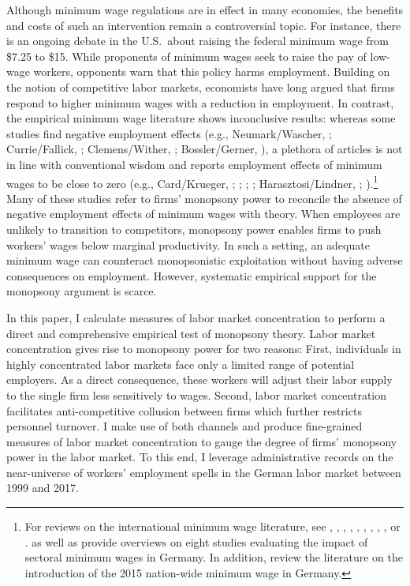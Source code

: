 \documentclass[11pt,oneside,reqno,xcolor=dvipsnames]{article} %
\begin{document}
Although minimum wage regulations are in effect in many economies, the benefits and costs of such an intervention remain a controversial topic. For instance, there is an ongoing debate in the U.S.\ about raising the federal minimum wage from \$7.25 to \$15. While proponents of minimum wages seek to raise the pay of low-wage workers, opponents warn that this policy harms employment. Building on the notion of competitive labor markets, economists have long argued that firms respond to higher minimum wages with a reduction in employment. In contrast, the empirical minimum wage literature shows inconclusive results: whereas some studies find negative employment effects (e.g., Neumark/Wascher, \citeyear{NeumarkWascher1992}; Currie/Fallick, \citeyear{CurrieFallick1996}; Clemens/Wither, \citeyear{ClemensWither2019}; Bossler/Gerner, \citeyear{BosslerGerner2020}), a plethora of articles is not in line with conventional wisdom and reports employment effects of minimum wages to be close to zero (e.g., Card/Krueger, \citeyear{CardKrueger1994}; \citealp{DubeEtAl2010}; \citealp{AllegrettoEtAl2011}; \citealp{CengizEtAl2019}; Harasztosi/Lindner, \citeyear{HarasztosiLindner2019}; \citealp{DustmannEtAl2021}).\footnote{For reviews on the international minimum wage literature, see \citet{BrownEtAl1982}, \citet{CardKrueger1995}, \citet{DoladoEtAl1996}, \citet{Brown1999}, \citet{NeumarkWascher2008}, \citet{DoucouliagosStanley2009}, \citet{BelmanWolfson2014}, \citet{Neumark2019}, \citet{WolfsonBelman2019}, or \citet{NeumarkShirley2021}. \citet{Moeller2012} as well as \citet{FitzenbergerDoerr2016} provide overviews on eight studies evaluating the impact of sectoral minimum wages in Germany. In addition, \citet{CaliendoEtAl2019} review the literature on the introduction of the 2015 nation-wide minimum wage in Germany.} Many of these studies refer to firms' monopsony power to reconcile the absence of negative employment effects of minimum wages with theory. When employees are unlikely to transition to competitors, monopsony power enables firms to push workers' wages below marginal productivity. In such a setting, an adequate minimum wage can counteract monopsonistic exploitation without having adverse consequences on employment. However, systematic empirical support for the monopsony argument is scarce.


In this paper, I calculate measures of labor market concentration to perform a direct and comprehensive empirical test of monopsony theory. Labor market concentration gives rise to monopsony power for two reasons: First, individuals in highly concentrated labor markets face only a limited range of potential employers. As a direct consequence, these workers will adjust their labor supply to the single firm less sensitively to wages. Second, labor market concentration facilitates anti-competitive collusion between firms which further restricts personnel turnover. I make use of both channels and produce fine-grained measures of labor market concentration to gauge the degree of firms' monopsony power in the labor market. To this end, I leverage administrative records on the near-universe of workers' employment spells in the German labor market between 1999 and 2017.
\end{document}
